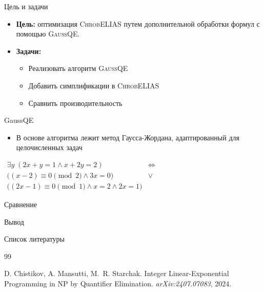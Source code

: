 \documentclass{beamer}
\newcommand{\chro}{\textsc{ChrobELIAS}\xspace}
\newcommand{\gaussqe}{\textsc{GaussQE}\xspace}
\begin{document}
\begin{frame}{Цель и задачи}
    \begin{itemize}
      \item \textbf{Цель:} оптимизация \chro путем дополнительной обработки формул с помощью \gaussqe \cite{chistikov2024}.
      \item \textbf{Задачи:}
      \begin{itemize}
        \item Реализовать алгоритм \gaussqe
        \item Добавить симплификации в \chro
        \item Сравнить производительность
      \end{itemize}
    \end{itemize}
\end{frame}

\begin{frame}{GaussQE}
    \begin{itemize}
        \item В основе алгоритма лежит метод Гаусса-Жордана, адаптированный для целочисленных задач
    \end{itemize}
    \vspace{1cm}  
    \centering
    $
    \begin{array}{rcl}
    \exists y \; (2x + y = 1 \land x + 2y = 2) & \Longleftrightarrow & \\
    \bigl( (x - 2) \equiv 0 \pmod{2} \land 3x = 0 \bigr) & \lor & \\
    \bigl( (2x - 1) \equiv 0 \pmod{1} \land x = 2 \land 2x = 1 \bigr) & &
    \end{array}
    $
\end{frame}

\begin{frame}{Сравнение}
    
\end{frame}

\begin{frame}{Вывод}
    
\end{frame}

\begin{frame}{Список литературы}
    \begin{thebibliography}{99}
    
    D. Chistikov, A. Mansutti, M.~R. Starchak.
    \newblock Integer Linear-Exponential Programming in NP by Quantifier Elimination.
    \newblock \emph{arXiv:2407.07083}, 2024.
    \end{thebibliography}
\end{frame}
\end{document}
